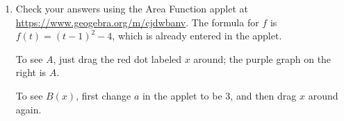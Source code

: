 \documentclass{article}
\begin{document}
\begin{enumerate}[topsep=0pt]
\begin{enumerate}
\begin{problem}[\stretch{2}]
    Let $B(x)=\displaystyle\int_3^x f(t)\,dt$. 
    Sketch a rough graph of $B(x)$.
    (\emph{Hint:} What do you
      know about how $B(x)$ relates to 
      $A(x)$?  What is $B(3)$?
      You may want to look back at
      {{{Problem Set 23}, {{\#6}}}}.)
    \end{problem}

    \begin{solution} %
      As we saw in {{{Problem Set 23}, {{\#6}}}},
        $B(x)$ and $A(x)$ differ by a constant.
        Graphically, that means the graph of $B(x)$
        is a vertical
        shift of the graph of $A(x)$.  Since $B(3) =
        \displaystyle \int_3^3 f(t)\,dt = 0$, we must shift the graph of
        $A$ vertically until it crosses the $x$-axis at $x = 3$ to
        get the graph of $A$: 
    \begin{center}
    \end{center}
    \end{solution}

  \item
    \begin{problem}
      Check your answers using the Area Function applet at
      \url{https://www.geogebra.org/m/cjdwbanv}.  The formula for
      $f$ is $f(t) = (t - 1)^2 - 4$, which is already entered in the
      applet.

      To see $A$, just drag the red dot labeled $x$ around; the purple
      graph on the right is $A$.

      To see $B(x)$, first change $a$ in the
      applet to be $3$, and then drag $x$ around again.
    \end{problem}



\end{enumerate}
\end{enumerate}
\end{document}
